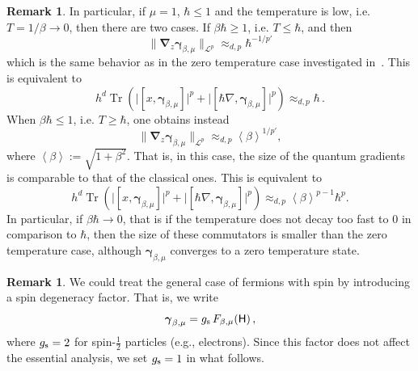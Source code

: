 \documentclass[11pt]{amsart}
\theoremstyle{plain}
\theoremstyle{definition}
\newtheorem{remark}[theorem]{Remark}
\newcommand		{\cL}		{\mathcal L}		%
\newcommand		\sfH		{\mathsf H}			%
\newcommand		{\lt}			{\left}				%
\newcommand		{\rt}			{\right}			%
\renewcommand	{\(}			{\lt(}
\renewcommand	{\)}			{\rt)}
\newcommand		{\bangle}[1]	{\lt\langle #1\rt\rangle}
\newcommand		{\weight}[1]	{\bangle{#1}}	%
\newcommand		{\bnrm}[1]		{\big\lVert #1\big\rVert}	%
\newcommand		{\bNrm}[2]		{\bnrm{#1}_{#2}}
\DeclareMathOperator{\tr}		{Tr}				%
\newcommand		{\Tr}[1]		{\tr\!\( #1 \)}		%
\newcommand		{\hd}		{h^d}
\newcommand		{\opgam}	{{\boldsymbol{\gamma}}}	%
\newcommand		{\Dh}		{\boldsymbol{\nabla}}	%
\newcommand		{\Dhz}[1]	{\Dh_{\!z} #1}
\begin{document}
	\begin{remark}
		In particular, if $\mu=1$, $\hbar\leq 1$ and the temperature is low, i.e. $T = 1/\beta\to 0$, then there are two cases. If $\beta\hbar \geq 1$, i.e. $T \leq \hbar$, and then
		\begin{equation*}
			\bNrm{ \Dhz \opgam_{\beta, \mu} }{\cL^p}
			\approx_{d, p} \hbar^{-1/p'}
		\end{equation*}
		which is the same behavior as in the zero temperature case investigated in~\cite{fournais_optimal_2020, benedikter_effective_2022, lafleche_optimal_2024, cardenas_commutator_2025}. This is equivalent to
		\begin{equation*}
			\hd \Tr{\lvert[x,\opgam_{\beta,\mu}]\rvert^p + \lvert[\hbar\nabla,\opgam_{\beta,\mu}]\rvert^p} \approx_{d, p} \hbar \, .
		\end{equation*}
		When $\beta\hbar\leq 1$, i.e. $T \geq \hbar$, one obtains instead
		\begin{equation*}
			\bNrm{ \Dhz \opgam_{\beta, \mu} }{\cL^p}
			\approx_{d, p} \weight{\beta}^{1/p'} ,
		\end{equation*}
        where $\weight{\beta} := \sqrt{1+\beta^2}$. That is, in this case, the size of the quantum gradients is comparable to that of the classical ones. This is equivalent to
		\begin{equation*}
			\hd \Tr{\lvert[x,\opgam_{\beta,\mu}]\rvert^p + \lvert[\hbar\nabla,\opgam_{\beta,\mu}]\rvert^p} \approx_{d, p} \weight{\beta}^{p-1} \hbar^p .
		\end{equation*}
		In particular, if $\beta\hbar\to 0$, that is if the temperature does not decay too fast to $0$ in comparison to $\hbar$, then the size of these commutators is smaller than the zero temperature case, although $\opgam_{\beta,\mu}$ converges to a zero temperature state.
	\end{remark}

    \begin{remark}
        We could treat the general case of fermions with spin by introducing a spin degeneracy factor. That is, we write
        \begin{equation*}
            \opgam_{\beta, \mu} = g_{\textnormal{s}} \, F_{\beta,\mu}(\sfH) \,,
        \end{equation*}
        where $g_{\textnormal{s}} = 2$ for spin-$\frac{1}{2}$ particles (e.g., electrons). Since this factor does not affect the essential analysis, we set $g_{\textnormal{s}} = 1$ in what follows.
    \end{remark}
\end{document}
